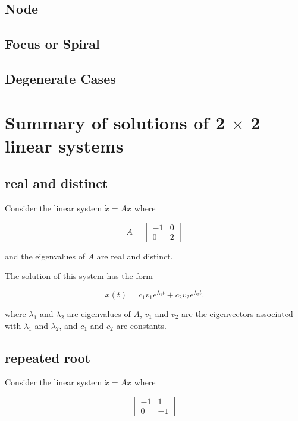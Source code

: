 \documentclass[12pt]{article}
\theoremstyle{definition}
\begin{document}
\subsection{Node}

\subsection{Focus or Spiral}

\subsection{Degenerate Cases}

\section{Summary of solutions of 2 $\times$ 2 linear systems}


\subsection{real and distinct}

Consider the linear system $\dot x = A x$ where 

\begin{equation*}
A =
\begin{bmatrix}
-1 & 0 \\
0 & 2
\end{bmatrix}
\end{equation*}

and the eigenvalues of $A$ are real and distinct.

The solution of this system has the form

\begin{equation*}
x(t) = c_1 v_1 e^{\lambda_1 t} + c_2 v_2 e^{\lambda_2 t}.
\end{equation*}

where $\lambda_1$ and $\lambda_2$ are eigenvalues of $A$, $v_1$ and $v_2$ are the eigenvectors associated with $\lambda_1$ and $\lambda_2$, and $c_1$ and $c_2$ are constants.

\subsection{repeated root}

Consider the linear system $\dot x = A x$ where 

\begin{equation*}
\begin{bmatrix}
-1 & 1 \\
0 & -1
\end{bmatrix}
\end{equation*}
\end{document}
